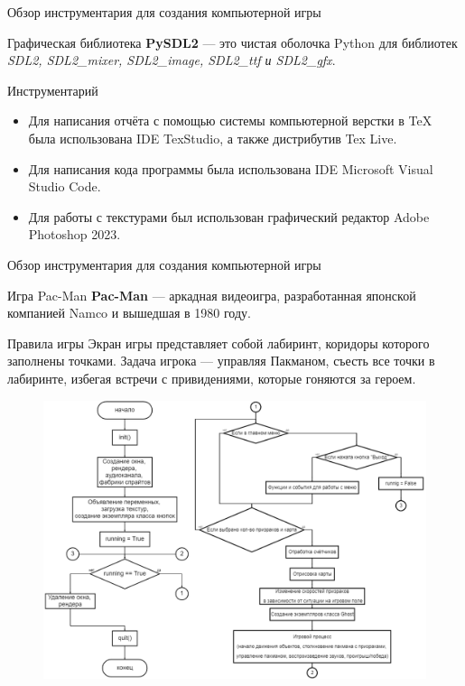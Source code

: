 \documentclass[10pt,a4paper,mathserif]{beamer}
\begin{document}
\begin{frame}{Обзор инструментария для создания компьютерной игры}
    \begin{block}{Графическая библиотека}
            \textbf{PySDL2} --- это чистая оболочка Python для библиотек \textit{SDL2, SDL2\_mixer, SDL2\_image, SDL2\_ttf и SDL2\_gfx}. 
    \end{block}

    \begin{block}{Инструментарий}
    \begin{itemize}
        \item Для написания отчёта с помощью системы компьютерной верстки в \TeX{} была использована IDE TexStudio, а также дистрибутив Tex Live.
        \item Для написания кода программы была использована IDE Microsoft Visual Studio Code.
        \item Для работы с текстурами был использован графический редактор Adobe Photoshop 2023.
    \end{itemize}
    \end{block}
\end{frame}

\begin{frame}{Обзор инструментария для создания компьютерной игры}
    \begin{block}{Игра Pac-Man}
        \textbf{Pac-Man} --- аркадная видеоигра, разработанная японской компанией Namco и вышедшая в 1980 году.
    \end{block}

    \begin{block}{Правила игры}
        Экран игры представляет собой лабиринт, коридоры которого заполнены точками. Задача игрока --- управляя Пакманом, съесть все точки в лабиринте, избегая встречи с привидениями, которые гоняются за героем.
    \end{block}
\end{frame}

\begin{frame}{}
    \vspace{-0.5cm}\begin{figure}[H]
      \centering
      \hspace{-0.5cm}\includegraphics[width=1\textwidth]{src/1.png}
    \end{figure}
\end{frame}
\end{document}
